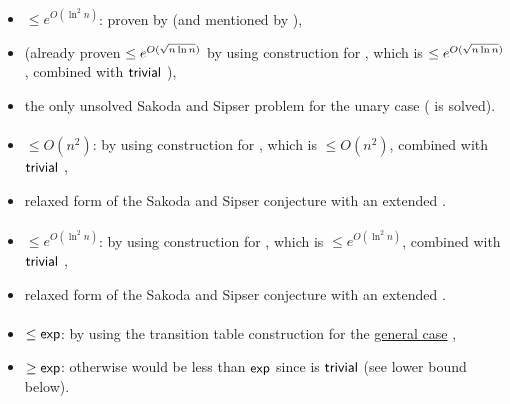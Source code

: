 \paragraph{\TNFA{}\tto\TDFA}\label{cost:2NFAto2DFAu}
\begin{itemize}
	\item $\le e^{O(\ln^2n)}$: proven by  (and mentioned by ),
	\item (already proven $\le e^{O(\sqrt{n\ln n})}$ by using construction for \hyperref[cost:2NFAto1DFAu]{\TNFA{}\tto\ODFA}, which is $\le e^{O(\sqrt{n\ln n})}$, combined with $\mathsf{trivial}$ \ODFA{}\tto\TDFA),
	\item the only unsolved Sakoda and Sipser problem for the unary case (\hyperref[cost:1NFAto2DFAu]{\ONFA{}\tto\TDFA} is solved).
\end{itemize}
\paragraph{\ONFA{}\tto\ODLA}\label{cost:1NFAto1DLAu}
\begin{itemize}
	\item $\le O(n^2)$: by using construction for \hyperref[cost:1NFAto2DFAu]{\ONFA{}\tto\TDFA}, which is $\le O(n^2)$, combined with $\mathsf{trivial}$ \TDFA{}\tto\ODLA,
	\item relaxed form of the Sakoda and Sipser conjecture with an extended \TDFA.
\end{itemize}
\paragraph{\TNFA{}\tto\ODLA}
\begin{itemize}
	\item $\le e^{O(\ln^2n)}$: by using construction for \hyperref[cost:2NFAto2DFAu]{\TNFA{}\tto\TDFA}, which is $\le e^{O(\ln^2n)}$, combined with $\mathsf{trivial}$ \TDFA{}\tto\ODLA,
	\item relaxed form of the Sakoda and Sipser conjecture with an extended \TDFA.
\end{itemize}
\paragraph{\ODLA{}\tto\ODFA}\label{cost:1DLAto1DFAu}
\begin{itemize}
	\item $\le\mathsf{exp}$: by using the transition table construction for the \hyperref[cost:1DLAto1DFA]{general case} \cite{PigPis14},
	\item $\ge\mathsf{exp}$: otherwise \hyperref[cost:1DLAto2NFAu]{\ODLA{}\tto\TNFA} would be less than $\mathsf{exp}$ since \ODFA{}\tto\TNFA is $\mathsf{trivial}$ (see lower bound below).
\end{itemize}
